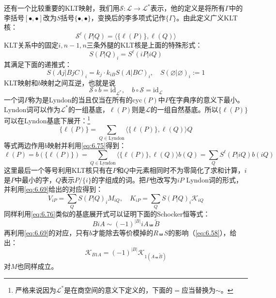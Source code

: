还有一个比较重要的KLT映射，我们用$\mathcal{S}:\mathcal{L}\to\mathcal{L}^*$表示，他的定义是将所有$\Gamma$中的李括号$[\bullet,\bullet]$改为$S$括号$\{\bullet,\bullet\}$，变换后的李多项式记作$\{\Gamma\}$。由此定义广义KLT核：
\begin{equation}
	\mathcal{S}^\ell(P| Q)=\langle\{\ell(P)\},\ell( Q)\rangle
\end{equation}
KLT关系中的固定$i,n-1,n$三条外腿的KLT核是上面的特殊形式：
\begin{equation}
	S(P|Q)_i=S^\ell(iP|iQ)
\end{equation}
其满足下面的递推式：\cite{Carrasco:2016ldy}
\begin{equation}
	S(Aj|BjC)_i=k_j\cdot k_{iB}S(A|BC)_i,\quad S(\varnothing|\varnothing)_i:=1
\end{equation}
KLT映射和$b$映射之间互逆，也就是说
\begin{equation}
	\label{eq:6.75}
	\mathcal{S}\circ b = \mathrm{id}_{\mathcal{L}^*},\quad b\circ \mathcal{S} = \mathrm{id}_{\mathcal{L}}
\end{equation}
一个词$P$称为是Lyndon的当且仅当在所有的$\mathrm{cyc}(P)$中$P$在字典序的意义下最小。Lyndon词可以作为$\mathcal{L}^*$的一组基底，$\ell(P)$则是$\mathcal{L}$的一组自然基底。所以$\{\ell(P)\}$可以在Lyndon基底下展开：\footnote{严格来说因为$\mathcal{L}^*$是在商空间的意义下定义的，下面的$=$应当替换为$\sim$。}
\begin{equation}
	\label{eq:6.76}
	\{\ell( {P})\}=\sum_{ {Q}\in \mathrm{Lyndon}}\langle\{\ell( {P})\},\ell( {Q})\rangle {Q}
\end{equation}
等式两边作用$b$映射并利用\ref{eq:6.75}得到：
\begin{equation}
	\ell(P)=b(\{\ell(  {P})\})=\sum_{  {Q}\in\mathrm{Lyndon}}\langle\{\ell(  {P})\},\ell(  {Q})\rangle b(  {Q})=\sum_QS^\ell(P|iQ)b(iQ)
\end{equation}
这里最后一个等号利用KLT核只有在$P$和$Q$中元素相同时不为零简化了求和计算，$i$是$P$中最小的字，$Q$表示$P/\{i\}$的字组成的词。把$P$也改写为$iP$ Lyndon词的形式，并利用\ref{eq:6.69}给出的对应得到：
\begin{equation}
	\label{eq:6.78}
	V_{iP}=\sum_{Q}S(P|Q)_iM_{iQ},\quad K_{iP}=\sum_{Q}S(P|Q)_i\mathcal{K}_{iQ}
\end{equation}
同样利用\ref{eq:6.76}类似的基底展开式可以证明下面的Schocker恒等式：
\begin{equation}
	B i A \sim (-1)^{|B|} i A \shuffle\tilde{B}
\end{equation}
再利用\ref{eq:6.69}的对应，只有$b$才能除去等价模掉的$R\shuffle S$的影响（\ref{eq:6.58}），给出：
\begin{equation}
	\label{schocker}
	\mathcal{K}_{B1A}=(-1)^{|B|}\mathcal{K}_{1(A\shuffle\tilde{B})}
\end{equation}
对$M$也同样成立。

